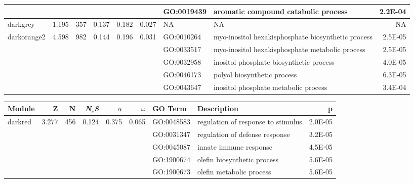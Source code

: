 \documentclass{ut-thesis}
\begin{document}
\begin{landscape}
\begin{table}[ht]
\begin{tabular}{|l|rrrrrlP{5cm}r|}
   &  &  &  &  &  & GO:0019439 & aromatic compound catabolic process & 2.2E-04 \\ 
\hline 
 darkgrey & 1.195 & 357 & 0.137 & 0.182 & 0.027 &  NA &  NA & NA \\ 
\hline
  darkorange2 & 4.598 & 982 & 0.144 & 0.196 & 0.031 & GO:0010264 & myo-inositol hexakisphosphate biosynthetic process & 2.5E-05 \\ 
   &  &  &  &  &  & GO:0033517 & myo-inositol hexakisphosphate metabolic process & 2.5E-05 \\ 
   &  &  &  &  &  & GO:0032958 & inositol phosphate biosynthetic process & 4.0E-05 \\ 
   &  &  &  &  &  & GO:0046173 & polyol biosynthetic process & 6.3E-05 \\ 
   &  &  &  &  &  & GO:0043647 & inositol phosphate metabolic process & 3.4E-04 \\ 
\hline
\end{tabular}
\end{table}


\begin{table}[ht]
\centering
\begin{tabular}{|l|rrrrrlP{5cm}r|}
  \hline
Module & Z & N & \textit{N$_{e}$S}& $\alpha$ & $\omega$ & GO Term & Description & p \\ 
  \hline
  darkred & 3.277 & 456 & 0.124 & 0.375 & 0.065 & GO:0048583 & regulation of response to stimulus & 2.0E-05 \\ 
   &  &  &  &  &  & GO:0031347 & regulation of defense response & 3.2E-05 \\ 
   &  &  &  &  &  & GO:0045087 & innate immune response & 4.5E-05 \\ 
   &  &  &  &  &  & GO:1900674 & olefin biosynthetic process & 5.6E-05 \\ 
   &  &  &  &  &  & GO:1900673 & olefin metabolic process & 5.6E-05 \\ 
\hline


\end{tabular}
\end{table}
\end{landscape}
\end{document}
